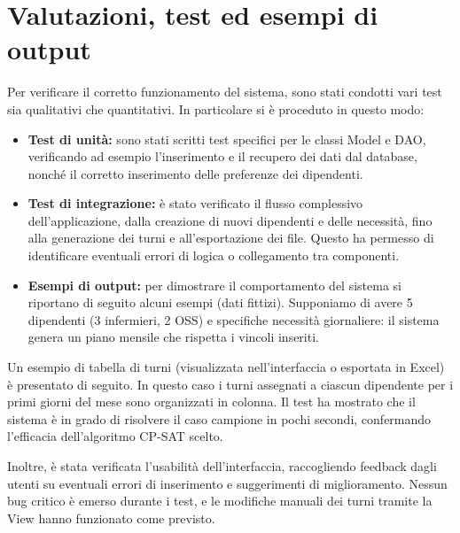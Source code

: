 \documentclass[a4paper,12pt]{report}
\begin{document}
\chapter{Valutazioni, test ed esempi di output}
\label{cap:valutazione}
Per verificare il corretto funzionamento del sistema, sono stati condotti vari test sia qualitativi che quantitativi. In particolare si \`e proceduto in questo modo:
\begin{itemize}
    \item \textbf{Test di unit\`a:} sono stati scritti test specifici per le classi Model e DAO, verificando ad esempio l'inserimento e il recupero dei dati dal database, nonch\'e il corretto inserimento delle preferenze dei dipendenti.
    \item \textbf{Test di integrazione:} \`e stato verificato il flusso complessivo dell'applicazione, dalla creazione di nuovi dipendenti e delle necessit\`a, fino alla generazione dei turni e all'esportazione dei file. Questo ha permesso di identificare eventuali errori di logica o collegamento tra componenti.
    \item \textbf{Esempi di output:} per dimostrare il comportamento del sistema si riportano di seguito alcuni esempi (dati fittizi). Supponiamo di avere 5 dipendenti (3 infermieri, 2 OSS) e specifiche necessit\`a giornaliere: il sistema genera un piano mensile che rispetta i vincoli inseriti.
\end{itemize}

Un esempio di tabella di turni (visualizzata nell'interfaccia o esportata in Excel) \`e presentato di seguito. In questo caso i turni assegnati a ciascun dipendente per i primi giorni del mese sono organizzati in colonna. Il test ha mostrato che il sistema \`e in grado di risolvere il caso campione in pochi secondi, confermando l'efficacia dell'algoritmo CP-SAT scelto.

Inoltre, \`e stata verificata l'usabilit\`a dell'interfaccia, raccogliendo feedback dagli utenti su eventuali errori di inserimento e suggerimenti di miglioramento. Nessun bug critico \`e emerso durante i test, e le modifiche manuali dei turni tramite la View hanno funzionato come previsto.

\end{document}
